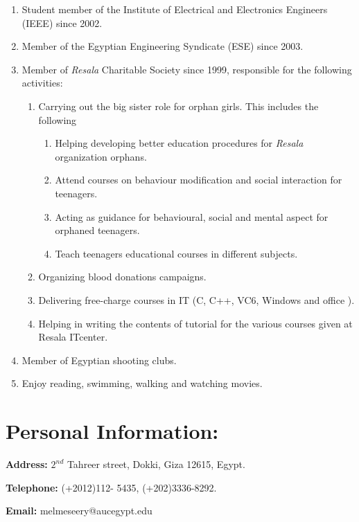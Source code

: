 \documentclass{article}
\begin{document}
\begin{enumerate}
\item  Student member of the Institute of Electrical and Electronics Engineers
(IEEE) since 2002.
\item  Member of the Egyptian Engineering Syndicate (ESE) since 2003.
\item  Member of \textit{Resala} Charitable Society since 1999, responsible for
the following activities:
\begin{enumerate}
\item  Carrying out the big sister role for orphan girls. This includes the following
  \begin{enumerate}
\item Helping developing better education procedures for \textit{Resala}
organization orphans.
\item Attend courses on behaviour modification and  social interaction for
teenagers.
\item Acting as guidance for behavioural, social and mental aspect for orphaned
teenagers.

\item Teach teenagers educational courses in different subjects.
\end{enumerate}
\item  Organizing blood donations campaigns.
\item  Delivering free-charge courses in IT (C, C++, VC6, Windows and office ).
\item  Helping in writing the contents of tutorial for the various courses given at Resala ITcenter.
\end{enumerate}
\item  Member of Egyptian shooting clubs.
\item  Enjoy reading, swimming, walking and watching movies.
\end{enumerate}
\newpage
\section*{Personal Information:}
\noindent
 \textbf{ Address: } $2^{nd}$ Tahreer street, Dokki, Giza 12615, Egypt.

 \textbf{ Telephone:} (+2012)112- 5435, (+202)3336-8292.

\textbf{  Email: }  melmeseery@aucegypt.edu
\end{document}
